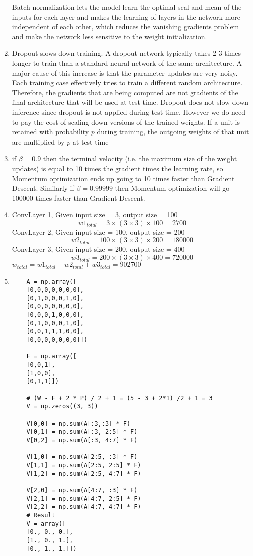 \documentclass[12pt]{article}
\begin{document}
\begin{enumerate}
Batch normalization lets the model learn the optimal scal and mean of the inputs for each layer and makes the
learning of layers in the network more independent of each other, which reduces the vanishing gradients problem and make the network less sensitive to the weight initialization.
\item Dropout slows down training. A dropout network typically takes 2-3 times longer to train than a standard neural network of the same architecture. A major cause of this increase is that the parameter updates are very noisy. Each training case effectively tries to train a different random architecture. Therefore, the gradients that are being computed are not gradients of the final architecture that will be
used at test time.
Dropout does not slow down inference since dropout is not applied during test time. However we do need to pay the cost of  scaling down versions of the trained weights. If a unit is retained with
probability $p$ during training, the outgoing weights of that unit are multiplied by $p$ at test
time
\item if $\beta = 0.9$ then the terminal velocity (i.e. the maximum size of the weight updates) is equal to 10 times the gradient times the learning rate, so Momentum optimization ends up going to 10 times faster than Gradient Descent. Similarly if $\beta=0.99999$ then Momentum optimization will go 100000 times faster than Gradient Descent.
\item
ConvLayer 1, Given input size = 3, output size = 100 
\[w1_{total} = 3 \times (3 \times 3) \times 100 = 27 00\] 
ConvLayer 2, Given input size = 100, output size = 200 
\[w2_{total} = 100 \times (3 \times 3) \times 200 = 180000\] 
ConvLayer 3, Given input size = 200, output size = 400 
\[w3_{total} = 200 \times (3 \times 3) \times 400 = 72 0000\]
$w_{total} = w1_{total} + w2_{total} + w3_{total} = 902700$
\\
\item
\begin{verbatim}
	A = np.array([
	[0,0,0,0,0,0,0],
	[0,1,0,0,0,1,0],
	[0,0,0,0,0,0,0],
	[0,0,0,1,0,0,0],
	[0,1,0,0,0,1,0],
	[0,0,1,1,1,0,0],
	[0,0,0,0,0,0,0]])
	
	F = np.array([
	[0,0,1],
	[1,0,0],
	[0,1,1]])
	
	# (W - F + 2 * P) / 2 + 1 = (5 - 3 + 2*1) /2 + 1 = 3
	V = np.zeros((3, 3))
	
	V[0,0] = np.sum(A[:3,:3] * F)
	V[0,1] = np.sum(A[:3, 2:5] * F)
	V[0,2] = np.sum(A[:3, 4:7] * F)
	
	V[1,0] = np.sum(A[2:5, :3] * F)
	V[1,1] = np.sum(A[2:5, 2:5] * F)
	V[1,2] = np.sum(A[2:5, 4:7] * F)
	
	V[2,0] = np.sum(A[4:7, :3] * F)
	V[2,1] = np.sum(A[4:7, 2:5] * F)
	V[2,2] = np.sum(A[4:7, 4:7] * F)
	# Result	
	V = array([
	[0., 0., 0.],
	[1., 0., 1.],
	[0., 1., 1.]])
\end{verbatim}
\end{enumerate}
\end{document}
